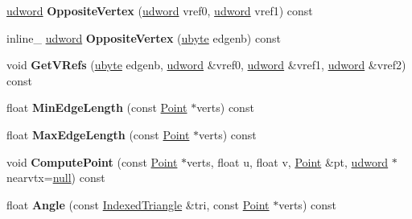\begin{DoxyCompactItemize}
\item 
\hyperlink{IceTypes_8h_a44c6f1920ba5551225fb534f9d1a1733}{udword} {\bfseries Opposite\+Vertex} (\hyperlink{IceTypes_8h_a44c6f1920ba5551225fb534f9d1a1733}{udword} vref0, \hyperlink{IceTypes_8h_a44c6f1920ba5551225fb534f9d1a1733}{udword} vref1) const \hypertarget{classIndexedTriangle_a0c7351a54375f0a939bc3707c28508c8}{}\label{classIndexedTriangle_a0c7351a54375f0a939bc3707c28508c8}

\item 
inline\+\_\+ \hyperlink{IceTypes_8h_a44c6f1920ba5551225fb534f9d1a1733}{udword} {\bfseries Opposite\+Vertex} (\hyperlink{IceTypes_8h_a5dd4f281954ce1405c92d62a427f839a}{ubyte} edgenb) const \hypertarget{classIndexedTriangle_ae86a63f6f634c0c67833e2f86b968c53}{}\label{classIndexedTriangle_ae86a63f6f634c0c67833e2f86b968c53}

\item 
void {\bfseries Get\+V\+Refs} (\hyperlink{IceTypes_8h_a5dd4f281954ce1405c92d62a427f839a}{ubyte} edgenb, \hyperlink{IceTypes_8h_a44c6f1920ba5551225fb534f9d1a1733}{udword} \&vref0, \hyperlink{IceTypes_8h_a44c6f1920ba5551225fb534f9d1a1733}{udword} \&vref1, \hyperlink{IceTypes_8h_a44c6f1920ba5551225fb534f9d1a1733}{udword} \&vref2) const \hypertarget{classIndexedTriangle_a8aa9652bf4799555773d2ecdf3da3291}{}\label{classIndexedTriangle_a8aa9652bf4799555773d2ecdf3da3291}

\item 
float {\bfseries Min\+Edge\+Length} (const \hyperlink{classPoint}{Point} $\ast$verts) const \hypertarget{classIndexedTriangle_a6b2352d5b214898c58f5c5bca7a360ec}{}\label{classIndexedTriangle_a6b2352d5b214898c58f5c5bca7a360ec}

\item 
float {\bfseries Max\+Edge\+Length} (const \hyperlink{classPoint}{Point} $\ast$verts) const \hypertarget{classIndexedTriangle_abad2f26ec2a8cee0c2753d094e87fb9c}{}\label{classIndexedTriangle_abad2f26ec2a8cee0c2753d094e87fb9c}

\item 
void {\bfseries Compute\+Point} (const \hyperlink{classPoint}{Point} $\ast$verts, float u, float v, \hyperlink{classPoint}{Point} \&pt, \hyperlink{IceTypes_8h_a44c6f1920ba5551225fb534f9d1a1733}{udword} $\ast$nearvtx=\hyperlink{IceTypes_8h_ac97b8ee753e4405397a42ad5799b0f9e}{null}) const \hypertarget{classIndexedTriangle_a4acfb3e8e81f5b8d7b59365d8d0d1897}{}\label{classIndexedTriangle_a4acfb3e8e81f5b8d7b59365d8d0d1897}

\item 
float {\bfseries Angle} (const \hyperlink{classIndexedTriangle}{Indexed\+Triangle} \&tri, const \hyperlink{classPoint}{Point} $\ast$verts) const \hypertarget{classIndexedTriangle_a876ee32ea917ca66141fe867a29ecbb4}{}\label{classIndexedTriangle_a876ee32ea917ca66141fe867a29ecbb4}


\end{DoxyCompactItemize}
